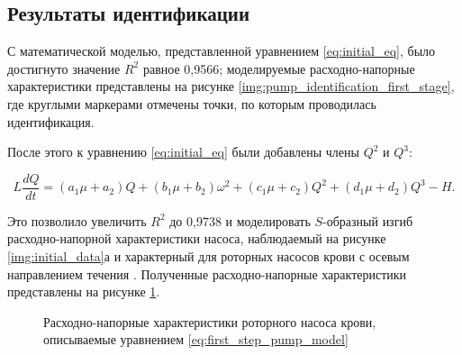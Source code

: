 \subsection{Результаты идентификации}

С математической моделью, представленной уравнением \eqref{eq:initial_eq}, было достигнуто значение $R^2$ равное 0,9566; моделируемые расходно-напорные характеристики представлены на рисунке \ref{img:pump_identification_first_stage}, где круглыми маркерами отмечены точки, по которым проводилась идентификация. 

После этого к уравнению \eqref{eq:initial_eq} были добавлены члены $Q^2$ и $Q^3$:

\begin{equation}
	\label{eq:first_step_pump_model}
	L\frac{dQ}{dt} = (a_1\mu+a_2)Q + (b_1\mu+b_2)\omega^2 + (c_1\mu+c_2)Q^2 + (d_1\mu+d_2)Q^3 - H.
\end{equation}


Это позволило увеличить $R^2$ до 0,9738 и моделировать $S$-образный изгиб расходно-напорной характеристики насоса, наблюдаемый на рисунке \ref{img:initial_data}а и характерный для роторных насосов крови с осевым направлением течения \cite{Pennings_2013}. Полученные расходно-напорные характеристики представлены на рисунке \ref{img:pump_identification_second_stage}.

\begin{figure}[ht]
  \caption{Расходно-напорные характеристики роторного насоса крови, описываемые уравнением \eqref{eq:first_step_pump_model}}
  \label{img:pump_identification_second_stage}  
\end{figure}

